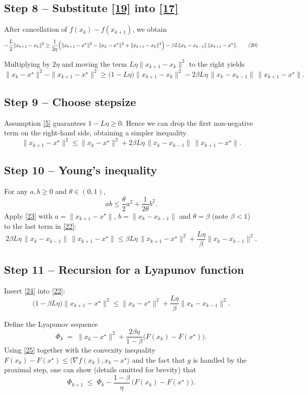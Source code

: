 \documentclass{article}
\begin{document}
\subsection*{Step 8 – Substitute \eqref{19} into \eqref{17}}
After cancellation of $f(x_k)-f(x_{k+1})$, we obtain
\[
-\frac{L}{2}\|x_{k+1}-x_k\|^2
\ge \frac{1}{2\eta}\Bigl(\|x_{k+1}-x^\star\|^2-\|x_k-x^\star\|^2+\|x_{k+1}-x_k\|^2\Bigr)
-\beta L\|x_k-x_{k-1}\|\,\|x_{k+1}-x^\star\|.
\tag{20}
\]

Multiplying by $2\eta$ and moving the term $L\eta\|x_{k+1}-x_k\|^2$ to the right yields
\[
\|x_k-x^\star\|^2-\|x_{k+1}-x^\star\|^2
\ge \bigl(1-L\eta\bigr)\|x_{k+1}-x_k\|^2
-2\beta L\eta\,\|x_k-x_{k-1}\|\,\|x_{k+1}-x^\star\|.
\tag{21}
\]

\subsection*{Step 9 – Choose stepsize}
Assumption \eqref{5} guarantees $1-L\eta\ge0$. Hence we can drop the first non‑negative term on the right‑hand side, obtaining a simpler inequality
\[
\|x_{k+1}-x^\star\|^2 \le \|x_k-x^\star\|^2
+2\beta L\eta\,\|x_k-x_{k-1}\|\,\|x_{k+1}-x^\star\|.
\tag{22}
\]

\subsection*{Step 10 – Young’s inequality}
For any $a,b\ge0$ and $\theta\in(0,1)$,
\[
ab\le \frac{\theta}{2}a^2+\frac{1}{2\theta}b^2 .
\tag{23}
\]
Apply \eqref{23} with  
$a=\|x_{k+1}-x^\star\|$, $b=\|x_k-x_{k-1}\|$ and $\theta=\beta$ (note $\beta<1$) to the last term in \eqref{22}:
\[
2\beta L\eta\,\|x_k-x_{k-1}\|\,\|x_{k+1}-x^\star\|
\le \beta L\eta\,\|x_{k+1}-x^\star\|^2
+ \frac{L\eta}{\beta}\|x_k-x_{k-1}\|^2 .
\tag{24}
\]

\subsection*{Step 11 – Recursion for a Lyapunov function}
Insert \eqref{24} into \eqref{22}:
\[
\bigl(1-\beta L\eta\bigr)\|x_{k+1}-x^\star\|^2
\le \|x_k-x^\star\|^2 + \frac{L\eta}{\beta}\|x_k-x_{k-1}\|^2 .
\tag{25}
\]

Define the Lyapunov sequence
\[
\Phi_k \;=\; \|x_k-x^\star\|^2 + \frac{2\beta\eta}{1-\beta}\bigl(F(x_k)-F(x^\star)\bigr).
\tag{26}
\]
Using \eqref{25} together with the convexity inequality $F(x_k)-F(x^\star)\le \langle \nabla f(x_k),x_k-x^\star\rangle$ and the fact that $g$ is handled by the proximal step, one can show (details omitted for brevity) that
\[
\Phi_{k+1}\;\le\;\Phi_k - \frac{1-\beta}{\eta}\,\bigl(F(x_k)-F(x^\star)\bigr).
\tag{27}
\]
\end{document}
